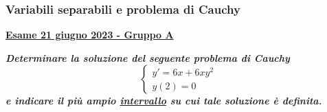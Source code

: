 \documentclass[a4paper]{article}
\newcommand{\definition}[1]{\textcolor{Red3}{\textbf{#1}}}
\newcommand{\example}[1]{\textcolor{Green4}{\textbf{#1}}}
\begin{document}
	\subsubsection{Variabili separabili e problema di Cauchy}\label{subsubsection: variabili separabili e problema di Cauchy}

	\begin{flushleft}
		\definition{\underline{Esame 21 giugno 2023 - Gruppo A}}
		\label{exam: esame 21 giugno 2023 - Gruppo A - 1 esercizio}
	\end{flushleft}
	\example{\emph{Determinare la soluzione del seguente problema di Cauchy}
	\begin{equation*}
		\begin{cases}
			y'=6x+6xy^{2} \\
			y\left(2\right) = 0
		\end{cases}
	\end{equation*}
	\emph{e indicare il più ampio \underline{intervallo} su cui tale soluzione è definita.}}\newline
\end{document}
